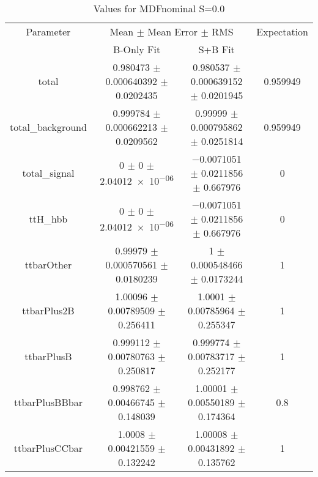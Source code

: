 \begin{table}
\centering
\caption{Values for MDFnominal S=0.0}
\begin{tabular}{cccc}
\toprule
Parameter & \multicolumn{2}{c}{Mean $\pm$ Mean Error $\pm$ RMS} & Expectation\\
 & B-Only Fit & S+B Fit & \\
\midrule
total & \num{0.980473} $\pm$ \num{0.000640392} $\pm$ \num{0.0202435} & \num{0.980537} $\pm$ \num{0.000639152} $\pm$ \num{0.0201945} & \num{0.959949}\\
total\_background & \num{0.999784} $\pm$ \num{0.000662213} $\pm$ \num{0.0209562} & \num{0.99999} $\pm$ \num{0.000795862} $\pm$ \num{0.0251814} & \num{0.959949}\\
total\_signal & \num{0} $\pm$ \num{0} $\pm$ \num{2.04012e-06} & \num{-0.0071051} $\pm$ \num{0.0211856} $\pm$ \num{0.667976} & \num{0}\\
ttH\_hbb & \num{0} $\pm$ \num{0} $\pm$ \num{2.04012e-06} & \num{-0.0071051} $\pm$ \num{0.0211856} $\pm$ \num{0.667976} & \num{0}\\
ttbarOther & \num{0.99979} $\pm$ \num{0.000570561} $\pm$ \num{0.0180239} & \num{1} $\pm$ \num{0.000548466} $\pm$ \num{0.0173244} & \num{1}\\
ttbarPlus2B & \num{1.00096} $\pm$ \num{0.00789509} $\pm$ \num{0.256411} & \num{1.0001} $\pm$ \num{0.00785964} $\pm$ \num{0.255347} & \num{1}\\
ttbarPlusB & \num{0.999112} $\pm$ \num{0.00780763} $\pm$ \num{0.250817} & \num{0.999774} $\pm$ \num{0.00783717} $\pm$ \num{0.252177} & \num{1}\\
ttbarPlusBBbar & \num{0.998762} $\pm$ \num{0.00466745} $\pm$ \num{0.148039} & \num{1.00001} $\pm$ \num{0.00550189} $\pm$ \num{0.174364} & \num{0.8}\\
ttbarPlusCCbar & \num{1.0008} $\pm$ \num{0.00421559} $\pm$ \num{0.132242} & \num{1.00008} $\pm$ \num{0.00431892} $\pm$ \num{0.135762} & \num{1}\\
\bottomrule
\end{tabular}
\end{table}